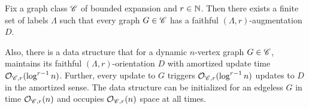 \begin{lemma}\label{lem:dyn-augmentation}
	Fix a graph class $\mathscr C$ of bounded expansion and $r\in \mathbb{N}$. Then there exists a finite set of labels $\Lambda$ such that every graph $G\in \mathscr C$ has a faithful $(\Lambda,r)$-augmentation $D$. 
	
	Also, there is a data structure that for a dynamic $n$-vertex graph $G\in \mathscr C$, maintains its faithful $(\Lambda,r)$-orientation $D$ with amortized update time $\mathcal{O}_{\mathscr C,r}(\log^{r-1} n)$. Further, every update to $G$ triggers $\mathcal{O}_{\mathscr C,r}(\log^{r-1} n)$ updates to $D$ in the amortized sense. The data structure can be initialized for an edgeless $G$ in time $\mathcal{O}_{\mathscr C,r}(n)$ and occupies $\mathcal{O}_{\mathscr C,r}(n)$ space at all times. 
\end{lemma}








